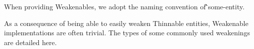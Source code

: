 \begin{code}%
\>[0]\AgdaSpace{}%
\AgdaSymbol{:}\AgdaSpace{}%
\AgdaSpace{}%
\AgdaSpace{}%
\AgdaSymbol{(}\AgdaSpace{}%
\AgdaSymbol{)}\<%
\\
\>[0]\AgdaSpace{}%
\AgdaSymbol{=}\AgdaSpace{}%
\AgdaSpace{}%
\<%
\\
%
\\[\AgdaEmptyExtraSkip]%
\>[0]\AgdaSpace{}%
\AgdaSymbol{:}\AgdaSpace{}%
\AgdaSpace{}%
\AgdaSpace{}%
\<%
\\
\>[0]\AgdaSpace{}%
\AgdaSpace{}%
\AgdaSymbol{=}\AgdaSpace{}%
\AgdaSpace{}%
\AgdaSymbol{\{}\AgdaSymbol{\}}\AgdaSpace{}%
\AgdaSpace{}%
\AgdaSpace{}%
\AgdaSpace{}%
\AgdaSpace{}%
\AgdaSpace{}%
\AgdaSymbol{(}\AgdaSpace{}%
\AgdaSymbol{)}\<%
\\
%
\\[\AgdaEmptyExtraSkip]%
\>[0]\AgdaSpace{}%
\AgdaSymbol{:}\AgdaSpace{}%
\AgdaSpace{}%
\AgdaSpace{}%
\AgdaSpace{}%
\AgdaSpace{}%
\<%
\\
\>[0]\AgdaSpace{}%
\AgdaSymbol{\{}\AgdaSymbol{\}}\AgdaSpace{}%
\AgdaSpace{}%
\AgdaSpace{}%
\AgdaSymbol{=}\AgdaSpace{}%
\AgdaSpace{}%
\AgdaSpace{}%
\<%
\end{code}

When providing Weakenables, we adopt the naming convention of \^̂some-entity.

As a consequence of being able to easily weaken Thinnable entities, Weakenable
implementations are often trivial. The types of some commonly used weakenings are detailed here.

